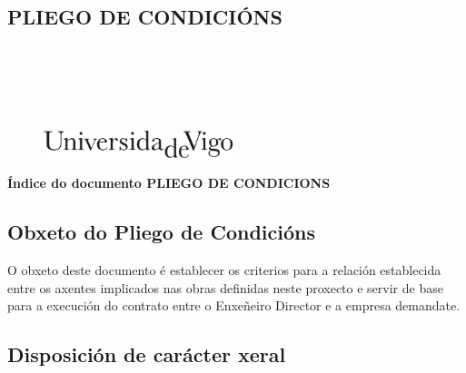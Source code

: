 \documentclass[11pt,twoside]{book}
\begin{document}
\begin{center}
\begin{normalsize}
\begin{center}
\part{\bf{PLIEGO DE CONDICIÓNS}}\thispagestyle{empty}
\end{center}
\end{normalsize}
\ \\
\ \\
\ \\
\ \\

\begin{center}
\begin{figure}[htbp]
\begin{center}
\includegraphics[angle=0, height=0.8cm]{images/UVIGOLogo.png}
\end{center}
\end{figure}
\end{center}

\end{center}

\cleardoublepage


\pagestyle{fancy}
\startcontents[parts]
\begin{center}{\large \bf Índice do documento PLIEGO DE CONDICIONS}\end{center}

{\hypersetup{hidelinks}}

\cleardoublepage

\chapter{Obxeto do Pliego de Condicións}

O obxeto deste documento é establecer os criterios para a relación establecida entre os axentes implicados nas obras definidas neste proxecto e servir de base para a execución do contrato entre o Enxeñeiro Director e a empresa demandate.


\chapter{Disposición de carácter xeral}
\end{document}
